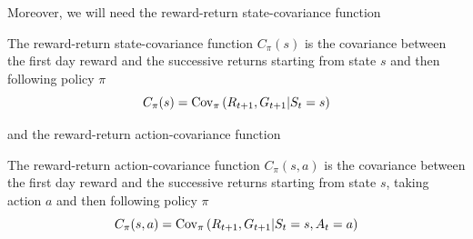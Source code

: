 Moreover, we will need the reward-return state-covariance function 
\begin{definition}
	The reward-return state-covariance function $C_\pi(s)$ is the covariance between the first day reward and the successive returns starting from state $s$ and then following policy $\pi$
	\begin{equation}
		C_\pi(s) = \Cov[\pi]{R_{t+1}, G_{t+1} | S_t = s}
	\end{equation}
\end{definition}
and the reward-return action-covariance function 
\begin{definition}
	The reward-return action-covariance function $C_\pi(s,a)$ is the covariance between the first day reward and the successive returns starting from state $s$, taking action $a$ and then following policy $\pi$
	\begin{equation}
		C_\pi(s,a) = \Cov[\pi]{R_{t+1}, G_{t+1} | S_t = s, A_t = a}
	\end{equation}
\end{definition}

